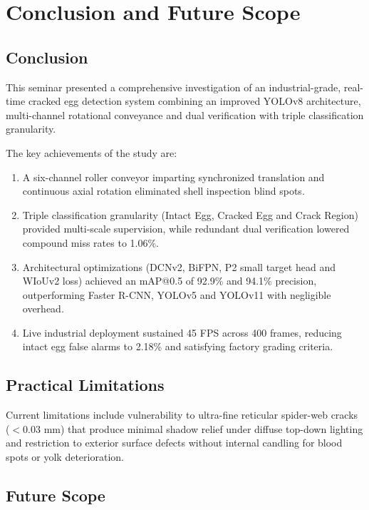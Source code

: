 \documentclass[12pt,a4paper]{report}
\begin{document}
\chapter{Conclusion and Future Scope}

\section{Conclusion}

This seminar presented a comprehensive investigation of an industrial-grade, real-time cracked egg detection system combining an improved YOLOv8 architecture, multi-channel rotational conveyance and dual verification with triple classification granularity.

The key achievements of the study are:
\begin{enumerate}[label=\arabic*.]
    \item A six-channel roller conveyor imparting synchronized translation and continuous axial rotation eliminated shell inspection blind spots.
    \item Triple classification granularity (Intact Egg, Cracked Egg and Crack Region) provided multi-scale supervision, while redundant dual verification lowered compound miss rates to 1.06\%.
    \item Architectural optimizations (DCNv2, BiFPN, P2 small target head and WIoUv2 loss) achieved an mAP@0.5 of 92.9\% and 94.1\% precision, outperforming Faster R-CNN, YOLOv5 and YOLOv11 with negligible overhead.
    \item Live industrial deployment sustained 45 FPS across 400 frames, reducing intact egg false alarms to 2.18\% and satisfying factory grading criteria.
\end{enumerate}

\section{Practical Limitations}

Current limitations include vulnerability to ultra-fine reticular spider-web cracks ($< 0.03$ mm) that produce minimal shadow relief under diffuse top-down lighting and restriction to exterior surface defects without internal candling for blood spots or yolk deterioration.

\section{Future Scope}
\end{document}
